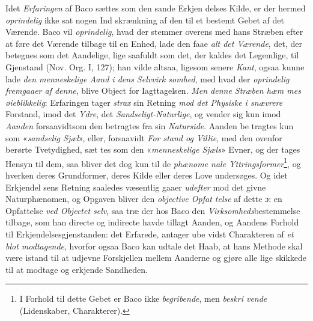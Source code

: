 Idet \emph{Erfaringen} af Baco sættes som den sande Erkjen\-%
delses Kilde, er der hermed \emph{oprindelig} ikke sat nogen Ind\-%
skrænkning af den til et bestemt Gebet af det Værende. Baco
vil \emph{oprindelig}, hvad der stemmer overens med hans Stræben
efter at føre det Værende tilbage til en Enhed, lade den faae
\emph{alt det Værende}, det, der betegnes som det Aandelige, lige\-%
saafuldt som det, der kaldes det Legemlige, til Gjenstand (Nov.
Org. I, 127); han vilde altsaa, ligesom senere \emph{Kant}, ogsaa
kunne lade \emph{den menneskelige Aand i dens Selvvirk\-%
somhed}, med hvad der \emph{oprindelig fremgaaer af denne},
blive Object for Iagttagelsen. \emph{Men denne Stræben hæm\-%
mes øieblikkelig}: Erfaringen tager \emph{strax} sin Retning \emph{mod
det Physiske i snævrere} Forstand, imod det \emph{Ydre}, det
\emph{Sandseligt-Naturlige}, og vender sig kun imod \emph{Aanden}
forsaavidtsom den betragtes fra sin \emph{Naturside}. Aanden be\-%
tragtes kun som «\emph{sandselig Sjæl}», eller, forsaavidt \emph{For\-%
stand og Villie}, med den ovenfor berørte Tvetydighed, sæt\-%
tes som den «\emph{menneskelige Sjæls}» Evner, og der tages
Hensyn til dem, saa bliver det dog kun til de \emph{phænome\-%
nale Yttringsformer}\footnote{I Forhold til dette Gebet er Baco ikke \emph{begribende}, men \emph{beskri\-%
vende} (Lidenskaber, Charakterer).}, og hverken deres Grundformer,
deres Kilde eller deres Love undersøges. Og idet Erkjendel\-%
sens Retning saaledes væsentlig gaaer \emph{udefter} mod det givne
Naturphænomen, og Opgaven bliver den \emph{objective Opfat\-%
telse} af dette ɔ: en Opfattelse \emph{ved Objectet selv}, saa træ\-%
der hos Baco den \emph{Virksomheds}bestemmelse tilbage, som
han directe og indirecte havde tillagt Aanden, og Aandens
Forhold til Erkjendelsesgjenstanden: det Erfarede, antager ube\-%
vidst Charakteren af \emph{et blot modtagende}, hvorfor ogsaa
Baco kan udtale det Haab, at hans Methode skal være istand
til at udjevne Forskjellen mellem Aanderne og gjøre alle lige
skikkede til at modtage og erkjende Sandheden.

